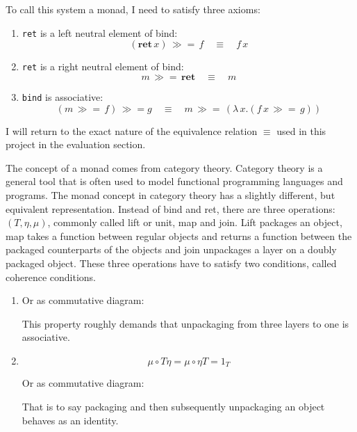 \documentclass[12pt,twoside,notitlepage]{report}
\begin{document}
To call this system a monad, I need to satisfy three axioms:

\begin{enumerate}
\item{\lstinline|ret| is a left neutral element of bind:
\[ (\textbf{ret} \, x) \, \gg=\, f \quad \equiv \quad f \, x \]}
\item{\lstinline|ret| is a right neutral element of bind:
\[ m \, \gg=\, \textbf{ret} \quad \equiv \quad m \]}
\item{\lstinline|bind| is associative:
\[ (m \, \gg= \, f) \, \gg= g \quad \equiv \quad m\, \gg= \, (\lambda\, x. (f\, x \, \gg= \, g) ) \]}
\end{enumerate}

I will return to the exact nature of the equivalence relation $ \equiv $ used in this project in the evaluation section. \label{sec:first_mention_of_equiv}


The concept of a monad comes from category theory. Category theory is a general tool that is often used to model functional programming languages and programs. The monad concept in category theory has a slightly different, but equivalent representation. Instead of bind and ret, there are three operations: $ (T, \eta, \mu) $, commonly called lift or unit, map and join. Lift packages an object, map takes a function between regular objects and returns a function between the packaged counterparts of the objects and join unpackages a layer on a doubly packaged object. These three operations have to satisfy two conditions, called coherence conditions.
\begin{enumerate}

\item{
\iftoggle{wordcount}{}{
\[ \mu \circ T \mu = \mu \circ \mu T \]
}
Or as commutative diagram:
\begin{center}
\end{center}
This property roughly demands that unpackaging from three layers to one is associative.



}
\item{
\[ \mu \circ T\eta = \mu \circ \eta T = 1_T \]

Or as commutative diagram:
\begin{center}
\end{center}

That is to say packaging and then subsequently unpackaging an object behaves as an identity.
}
\end{enumerate}
\end{document}
